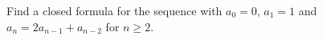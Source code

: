 Find a closed formula for the sequence with $a_0=0$, $a_1=1$ and $a_n=2a_{n-1}+a_{n-2}$ for $n\ge2$.
